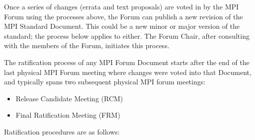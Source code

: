 Once a series of changes (errata and text proposals) are voted in by
the MPI Forum using the processes above, the Forum can publish a new
revision of the MPI Standard Document.  This could be a new minor or
major version of the standard; the process below applies to either.
The Forum Chair, after consulting with the members of the Forum,
initiates this process.

The ratification process of any MPI Forum Document starts after the
end of the last physical MPI Forum meeting where changes were voted
into that Document, and typically spans two subsequent physical MPI
forum meetings:

\begin{itemize}
\item Release Candidate Meeting (RCM)
\item Final Ratification Meeting (FRM)
\end{itemize}

Ratification procedures are as follows:

